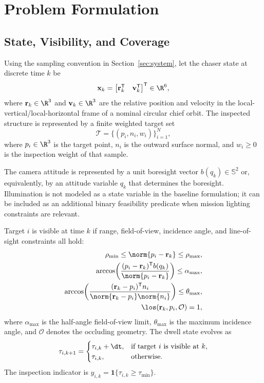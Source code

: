\section{Problem Formulation}
\label{sec:problem}

\subsection{State, Visibility, and Coverage}

Using the sampling convention in Section~\ref{sec:system}, let the chaser state
at discrete time $k$ be
\begin{equation}
  \mathbf{x}_k =
  \begin{bmatrix}
    \mathbf{r}_k^{\mathsf T} & \mathbf{v}_k^{\mathsf T}
  \end{bmatrix}^{\mathsf T} \in \R^6,
\end{equation}
where $\mathbf{r}_k \in \R^3$ and $\mathbf{v}_k \in \R^3$ are the relative position and velocity
in the local-vertical/local-horizontal frame of a nominal circular chief orbit.
The inspected structure is represented by a finite weighted target set
\begin{equation}
  \mathcal T = \{(p_i,n_i,w_i)\}_{i=1}^{N},
\end{equation}
where $p_i \in \R^3$ is the target point, $n_i$ is the outward surface normal,
and $w_i \ge 0$ is the inspection weight of that sample.

The camera attitude is represented by a unit boresight vector $b(q_k)\in\mathbb
S^2$ or, equivalently, by an attitude variable $q_k$ that determines the
boresight. Illumination is not modeled as a state variable in the baseline
formulation; it can be included as an additional binary feasibility predicate
when mission lighting constraints are relevant.

Target $i$ is visible at time $k$ if range, field-of-view, incidence angle, and
line-of-sight constraints all hold:
\begin{align}
  \rho_{\min} \le \norm{p_i-\mathbf{r}_k} \le \rho_{\max}, \label{eq:range}\\
  \arccos\!\left(\frac{(p_i-\mathbf{r}_k)^{\mathsf T} b(q_k)}{\norm{p_i-\mathbf{r}_k}}\right)
  \le \alpha_{\max}, \label{eq:fov}\\
  \arccos\!\left(\frac{(\mathbf{r}_k-p_i)^{\mathsf T}n_i}{\norm{\mathbf{r}_k-p_i}\norm{n_i}}\right)
  \le \theta_{\max}, \label{eq:view-angle}\\
  \los(\mathbf{r}_k,p_i,\mathcal O) = 1, \label{eq:los}
\end{align}
where $\alpha_{\max}$ is the half-angle field-of-view limit, $\theta_{\max}$
is the maximum incidence angle, and $\mathcal O$ denotes the occluding
geometry. The dwell state evolves as
\begin{equation}
  \tau_{i,k+1} =
  \begin{cases}
    \tau_{i,k}+\dt, & \text{if target } i \text{ is visible at } k,\\
    \tau_{i,k}, & \text{otherwise}.
  \end{cases}
\end{equation}
The inspection indicator is $y_{i,k}=\mathbf 1\{\tau_{i,k}\ge \tau_{\min}\}$.

